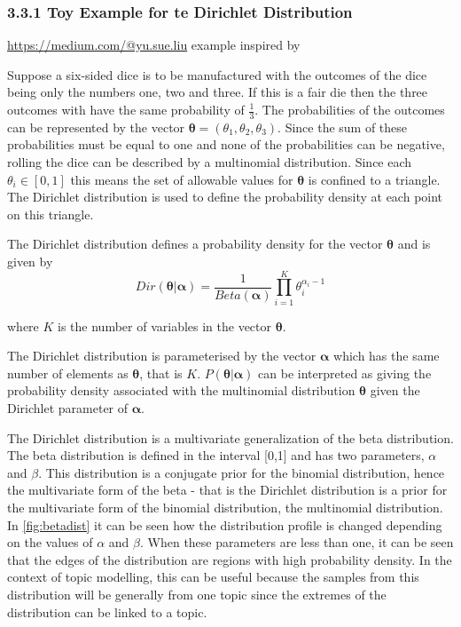 \documentclass[
]{article}
\begin{document}
\hypertarget{toy-example-for-te-dirichlet-distribution}{%
\subsubsection{3.3.1 Toy Example for te Dirichlet
Distribution}\label{toy-example-for-te-dirichlet-distribution}}

\url{https://medium.com/@yu.sue.liu} example inspired by

Suppose a six-sided dice is to be manufactured with the outcomes of the
dice being only the numbers one, two and three. If this is a fair die
then the three outcomes with have the same probability of
\(\frac{1}{3}\). The probabilities of the outcomes can be represented by
the vector
\(\boldsymbol{\mathbf{\theta}} = (\theta_{1}, \theta_{2}, \theta_{3})\).
Since the sum of these probabilities must be equal to one and none of
the probabilities can be negative, rolling the dice can be described by
a multinomial distribution. Since each \(\theta_{i} \in [0,1]\) this
means the set of allowable values for \(\boldsymbol{\mathbf{\theta}}\)
is confined to a triangle. The Dirichlet distribution is used to define
the probability density at each point on this triangle.

The Dirichlet distribution defines a probability density for the vector
\(\boldsymbol{\mathbf{\theta}}\) and is given by \begin{equation}
Dir(\boldsymbol{\mathbf{\theta}}| \boldsymbol{\alpha})= \frac{1}{Beta(\boldsymbol{\alpha})}\prod_{i=1}^{K}\theta_i^{\alpha_i -1}
\end{equation}

where \(K\) is the number of variables in the vector
\(\boldsymbol{\mathbf{\theta}}\).

The Dirichlet distribution is parameterised by the vector
\(\boldsymbol{\alpha}\) which has the same number of elements as
\(\boldsymbol{\mathbf{\theta}}\), that is \(K\).
\(P(\boldsymbol{\mathbf{\theta}}|\boldsymbol{\alpha})\) can be
interpreted as giving the probability density associated with the
multinomial distribution \(\boldsymbol{\mathbf{\theta}}\) given the
Dirichlet parameter of \(\boldsymbol{\alpha}\).

The Dirichlet distribution is a multivariate generalization of the beta
distribution. The beta distribution is defined in the interval {[}0,1{]}
and has two parameters, \(\alpha\) and \(\beta\). This distribution is a
conjugate prior for the binomial distribution, hence the multivariate
form of the beta - that is the Dirichlet distribution is a prior for the
multivariate form of the binomial distribution, the multinomial
distribution. In \ref{fig:betadist} it can be seen how the distribution
profile is changed depending on the values of \(\alpha\) and \(\beta\).
When these parameters are less than one, it can be seen that the edges
of the distribution are regions with high probability density. In the
context of topic modelling, this can be useful because the samples from
this distribution will be generally from one topic since the extremes of
the distribution can be linked to a topic.
\end{document}
